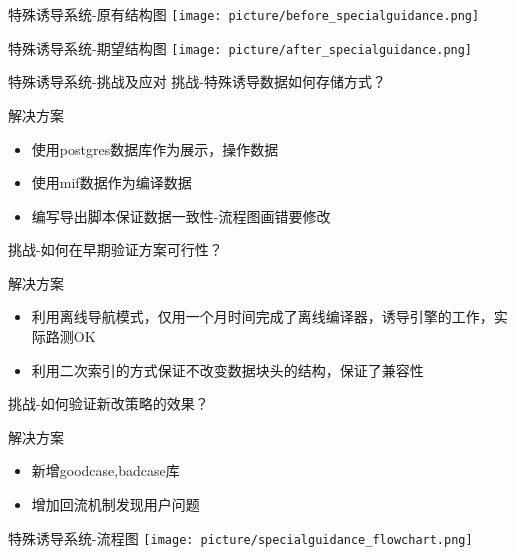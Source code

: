 \documentclass[10pt]{beamer}
\begin{document}
\begin{frame}{特殊诱导系统-原有结构图}
	\texttt{[image: picture/before\_specialguidance.png]}
\end{frame}

\begin{frame}{特殊诱导系统-期望结构图}
	\texttt{[image: picture/after\_specialguidance.png]}
\end{frame}

\begin{frame}{特殊诱导系统-挑战及应对}
	\alert{挑战-特殊诱导数据如何存储方式？}
	\begin{exampleblock}{解决方案}
		\begin{itemize}
			\item 使用postgres数据库作为展示，操作数据
			\item 使用mif数据作为编译数据
			\item 编写导出脚本保证数据一致性-流程图画错要修改
		\end{itemize}
	\end{exampleblock}
	\alert{挑战-如何在早期验证方案可行性？}
	\begin{exampleblock}{解决方案}
		\begin{itemize}
			\item 利用离线导航模式，仅用一个月时间完成了离线编译器，诱导引擎的工作，实际路测OK
			\item 利用二次索引的方式保证不改变数据块头的结构，保证了兼容性
		\end{itemize}
	\end{exampleblock}
		\alert{挑战-如何验证新改策略的效果？}
	\begin{exampleblock}{解决方案}
		\begin{itemize}
			\item 新增goodcase,badcase库
			\item 增加回流机制发现用户问题
		\end{itemize}
	\end{exampleblock}
\end{frame}

\begin{frame}{特殊诱导系统-流程图}
	\texttt{[image: picture/specialguidance\_flowchart.png]}
\end{frame}
\end{document}
